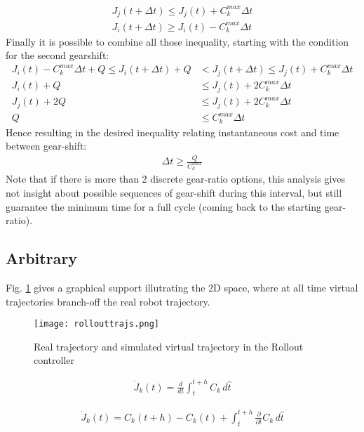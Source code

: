 %
\begin{align}
J_j(t+\Delta t) \leq J_j(t)  + C_k^{max} \Delta t \\
J_i(t+\Delta t) \geq J_i(t)  - C_k^{max} \Delta t 
\end{align}
%
Finally it is possible to combine all those inequality, starting with the condition for the second gearshift:
%
\begin{align}
J_i(t)  - C_k^{max} \Delta t + Q \leq J_i(t+\Delta t) + Q &< J_j(t+\Delta t) \leq J_j(t)  + C_k^{max} \Delta t \\
J_i(t) + Q &\leq J_j(t)  + 2 C_k^{max} \Delta t \\
J_j(t) + 2 Q &\leq J_j(t)  + 2 C_k^{max} \Delta t \\
Q &\leq C_k^{max} \Delta t 
\end{align}
%
Hence resulting in the desired inequality relating instantaneous cost and time between gear-shift:
%
\begin{align}
\Delta t \geq \frac{Q}{C_k^{max}}
\end{align}
%
Note that if there is more than 2 discrete gear-ratio options, this analysis gives not insight about possible sequences of gear-shift during this interval, but still guarantee the minimum time for a full cycle (coming back to the starting gear-ratio).

\subsection{Arbitrary}
\label{sec:chat2}

Fig. \ref{fig:rollouttrajs} gives a graphical support illutrating the 2D space, where at all time virtual trajectories branch-off the real robot trajectory.

\begin{figure}[H]
	\centering
		\texttt{[image: rollouttrajs.png]}
	\caption{Real trajectory and simulated virtual trajectory in the Rollout controller}
	\label{fig:rollouttrajs}
\end{figure}



%
\begin{align}
\dot{J}_k(t) = \frac{d}{dt} \int_{t}^{t+h}{  C_k \, d\hat{t} }
\end{align}
%

%
\begin{align}
\dot{J}_k(t) = C_k( t + h ) -  C_k( t ) +   \int_{t}^{t+h}{ \frac{\partial}{\partial t} C_k \, d\hat{t} }
\end{align}
%


